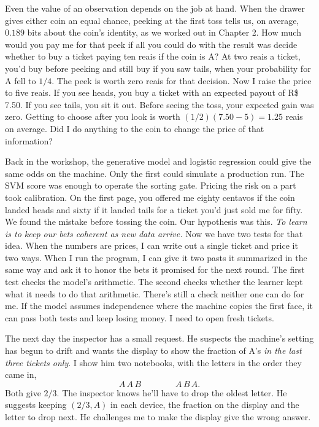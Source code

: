 Even the value of an observation depends on the job at hand. When the drawer gives either coin an equal chance, peeking at the first toss tells us, on average, $0.189$ bits about the coin's identity, as we worked out in Chapter 2. How much would you pay me for that peek if all you could do with the result was decide whether to buy a ticket paying ten reais if the coin is A? At two reais a ticket, you'd buy before peeking and still buy if you saw tails, when your probability for A fell to $1/4$. The peek is worth zero reais for that decision. Now I raise the price to five reais. If you see heads, you buy a ticket with an expected payout of R\$\,7.50. If you see tails, you sit it out. Before seeing the toss, your expected gain was zero. Getting to choose after you look is worth $(1/2)(7.50-5)=1.25$ reais on average. Did I do anything to the coin to change the price of that information?

Back in the workshop, the generative model and logistic regression could give the same odds on the machine. Only the first could simulate a production run. The SVM score was enough to operate the sorting gate. Pricing the risk on a part took calibration. On the first page, you offered me eighty centavos if the coin landed heads and sixty if it landed tails for a ticket you'd just sold me for fifty. We found the mistake before tossing the coin. Our hypothesis was this. \emph{To learn is to keep our bets coherent as new data arrive.} Now we have two tests for that idea. When the numbers are prices, I can write out a single ticket and price it two ways. When I run the program, I can give it two pasts it summarized in the same way and ask it to honor the bets it promised for the next round. The first test checks the model's arithmetic. The second checks whether the learner kept what it needs to do that arithmetic. There's still a check neither one can do for me. If the model assumes independence where the machine copies the first face, it can pass both tests and keep losing money. I need to open fresh tickets.

The next day the inspector has a small request. He suspects the machine's setting has begun to drift and wants the display to show the fraction of A's \emph{in the last three tickets only}. I show him two notebooks, with the letters in the order they came in,
\[
                           A\,A\,B \qquad\qquad A\,B\,A .
\]
Both give $2/3$. The inspector knows he'll have to drop the oldest letter. He suggests keeping $(2/3,A)$ in each device, the fraction on the display and the letter to drop next. He challenges me to make the display give the wrong answer.

